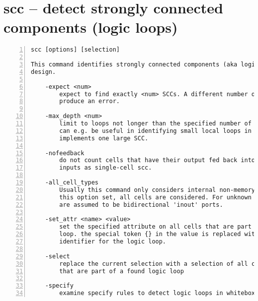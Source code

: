 \section{scc -- detect strongly connected components (logic loops)}
\label{cmd:scc}
\begin{lstlisting}[numbers=left,frame=single]
    scc [options] [selection]

This command identifies strongly connected components (aka logic loops) in the
design.

    -expect <num>
        expect to find exactly <num> SCCs. A different number of SCCs will
        produce an error.

    -max_depth <num>
        limit to loops not longer than the specified number of cells. This
        can e.g. be useful in identifying small local loops in a module that
        implements one large SCC.

    -nofeedback
        do not count cells that have their output fed back into one of their
        inputs as single-cell scc.

    -all_cell_types
        Usually this command only considers internal non-memory cells. With
        this option set, all cells are considered. For unknown cells all ports
        are assumed to be bidirectional 'inout' ports.

    -set_attr <name> <value>
        set the specified attribute on all cells that are part of a logic
        loop. the special token {} in the value is replaced with a unique
        identifier for the logic loop.

    -select
        replace the current selection with a selection of all cells and wires
        that are part of a found logic loop

    -specify
        examine specify rules to detect logic loops in whitebox/blackbox cells
\end{lstlisting}

